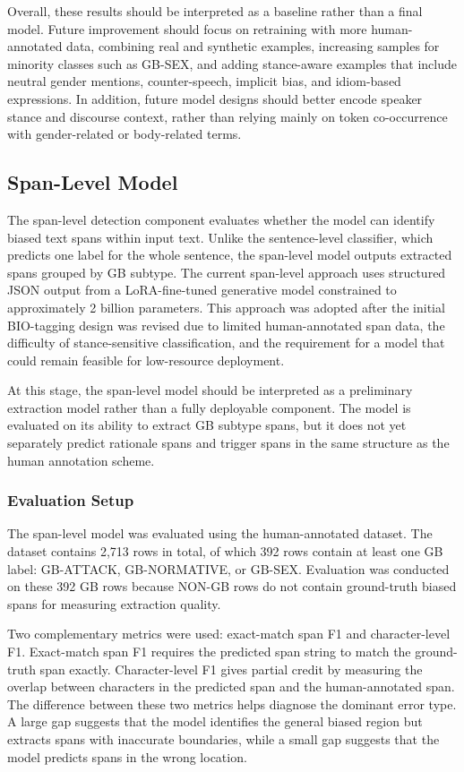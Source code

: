 \documentclass[12pt,oneside,openright,a4paper]{cpe-english-project}
\begin{document}
Overall, these results should be interpreted as a baseline rather than a final model. Future improvement should focus on retraining with more human-annotated data, combining real and synthetic examples, increasing samples for minority classes such as GB-SEX, and adding stance-aware examples that include neutral gender mentions, counter-speech, implicit bias, and idiom-based expressions. In addition, future model designs should better encode speaker stance and discourse context, rather than relying mainly on token co-occurrence with gender-related or body-related terms.

\subsection{Span-Level Model}

The span-level detection component evaluates whether the model can identify biased text spans within input text. Unlike the sentence-level classifier, which predicts one label for the whole sentence, the span-level model outputs extracted spans grouped by GB subtype. The current span-level approach uses structured JSON output from a LoRA-fine-tuned generative model constrained to approximately 2 billion parameters. This approach was adopted after the initial BIO-tagging design was revised due to limited human-annotated span data, the difficulty of stance-sensitive classification, and the requirement for a model that could remain feasible for low-resource deployment.

At this stage, the span-level model should be interpreted as a preliminary extraction model rather than a fully deployable component. The model is evaluated on its ability to extract GB subtype spans, but it does not yet separately predict rationale spans and trigger spans in the same structure as the human annotation scheme.

\subsubsection{Evaluation Setup}

The span-level model was evaluated using the human-annotated dataset. The dataset contains 2,713 rows in total, of which 392 rows contain at least one GB label: GB-ATTACK, GB-NORMATIVE, or GB-SEX. Evaluation was conducted on these 392 GB rows because NON-GB rows do not contain ground-truth biased spans for measuring extraction quality.

Two complementary metrics were used: exact-match span F1 and character-level F1. Exact-match span F1 requires the predicted span string to match the ground-truth span exactly. Character-level F1 gives partial credit by measuring the overlap between characters in the predicted span and the human-annotated span. The difference between these two metrics helps diagnose the dominant error type. A large gap suggests that the model identifies the general biased region but extracts spans with inaccurate boundaries, while a small gap suggests that the model predicts spans in the wrong location.
\end{document}
